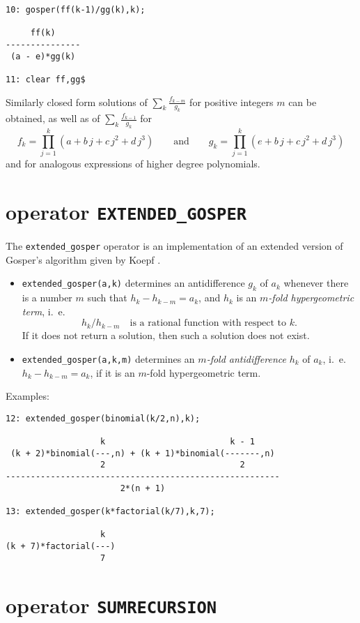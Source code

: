 {\small
\begin{verbatim}
10: gosper(ff(k-1)/gg(k),k);

     ff(k)
---------------
 (a - e)*gg(k)

11: clear ff,gg$
\end{verbatim}
}\noindent
Similarly closed form solutions of $\sum\nolimits_k\frac{f_{k-m}}{g_{k}}$
for positive integers $m$ can be obtained, as well as of
$\sum_k\frac{f_{k-1}}{g_{k}}$ for
\[
f_k=\prod_{j=1}^k (a+b\,j+c\,j^2+d\,j^3)
\quad\quad\mbox{and}\quad\quad
g_k=\prod_{j=1}^k (e+b\,j+c\,j^2+d\,j^3)
\]
and for analogous expressions of higher degree polynomials.

\section{\REDUCE{} operator {\tt EXTENDED\_GOSPER}}

The {\tt extended\verb+_+gosper} operator is an implementation of an extended
version of Gosper's algorithm given by Koepf \cite{Koepf}.
\begin{itemize}
\item
{\tt extended\verb+_+gosper(a,k)} determines an antidifference $g_k$ of $a_k$
whenever there is a number $m$ such that $h_{k}-h_{k-m}=a_k$, and $h_k$ is an
{\sl $m$-fold hypergeometric term}, i.\ e.
\[
h_{k}/h_{k-m}\quad\mbox{is a rational function with respect to $k$.}
\]
If it does not return a solution, then such a solution does not exist.
\item
{\tt extended\verb+_+gosper(a,k,m)}
determines an {\sl $m$-fold antidifference} $h_k$ of $a_k$,
i.\ e.\ $h_{k}-h_{k-m}=a_k$, if it is an $m$-fold hypergeometric term.
\end{itemize}
Examples:

{\small
\begin{verbatim}
12: extended_gosper(binomial(k/2,n),k);

                   k                         k - 1
 (k + 2)*binomial(---,n) + (k + 1)*binomial(-------,n)
                   2                           2
-------------------------------------------------------
                       2*(n + 1)

13: extended_gosper(k*factorial(k/7),k,7);

                   k
(k + 7)*factorial(---)
                   7
\end{verbatim}
}\noindent

\section{\REDUCE{} operator {\tt SUMRECURSION}}

